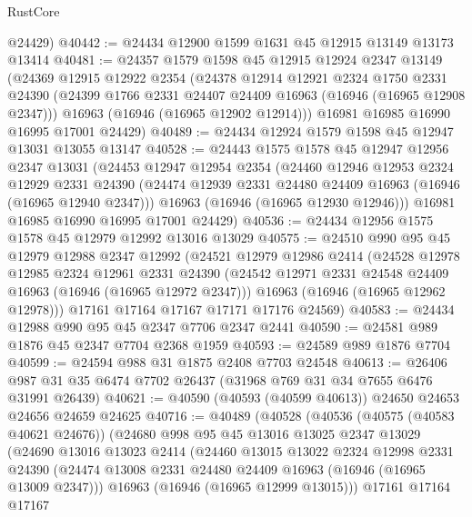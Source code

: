 \begin{lexlean}{RustCore}
\begin{coremodule}
      @24429)
@40442 := @24434 @12900 @1599 @1631 @45 @12915 @13149 @13173 @13414
@40481 := @24357
    @1579
    @1598
    @45
    @12915
    @12924
    @2347
    @13149
    (@24369
      @12915
      @12922
      @2354
      (@24378
        @12914
        @12921
        @2324
        @1750
        @2331
        @24390
        (@24399 @1766 @2331 @24407 @24409 @16963 (@16946 (@16965 @12908 @2347)))
        @16963
        (@16946 (@16965 @12902 @12914)))
      @16981
      @16985
      @16990
      @16995
      @17001
      @24429)
@40489 := @24434 @12924 @1579 @1598 @45 @12947 @13031 @13055 @13147
@40528 := @24443
    @1575
    @1578
    @45
    @12947
    @12956
    @2347
    @13031
    (@24453
      @12947
      @12954
      @2354
      (@24460
        @12946
        @12953
        @2324
        @12929
        @2331
        @24390
        (@24474 @12939 @2331 @24480 @24409 @16963 (@16946 (@16965 @12940 @2347)))
        @16963
        (@16946 (@16965 @12930 @12946)))
      @16981
      @16985
      @16990
      @16995
      @17001
      @24429)
@40536 := @24434 @12956 @1575 @1578 @45 @12979 @12992 @13016 @13029
@40575 := @24510
    @990
    @95
    @45
    @12979
    @12988
    @2347
    @12992
    (@24521
      @12979
      @12986
      @2414
      (@24528
        @12978
        @12985
        @2324
        @12961
        @2331
        @24390
        (@24542 @12971 @2331 @24548 @24409 @16963 (@16946 (@16965 @12972 @2347)))
        @16963
        (@16946 (@16965 @12962 @12978)))
      @17161
      @17164
      @17167
      @17171
      @17176
      @24569)
@40583 := @24434 @12988 @990 @95 @45 @2347 @7706 @2347 @2441
@40590 := @24581 @989 @1876 @45 @2347 @7704 @2368 @1959
@40593 := @24589 @989 @1876 @7704
@40599 := @24594 @988 @31 @1875 @2408 @7703 @24548
@40613 := @26406 @987 @31 @35 @6474 @7702 @26437 (@31968 @769 @31 @34 @7655 @6476 @31991 @26439)
@40621 := @40590 (@40593 (@40599 @40613)) @24650 @24653 @24656 @24659 @24625
@40716 := @40489
    (@40528
      (@40536
        (@40575 (@40583 @40621 @24676))
        (@24680
          @998
          @95
          @45
          @13016
          @13025
          @2347
          @13029
          (@24690
            @13016
            @13023
            @2414
            (@24460
              @13015
              @13022
              @2324
              @12998
              @2331
              @24390
              (@24474 @13008 @2331 @24480 @24409 @16963 (@16946 (@16965 @13009 @2347)))
              @16963
              (@16946 (@16965 @12999 @13015)))
            @17161
            @17164
            @17167

\end{coremodule}
\end{lexlean}
